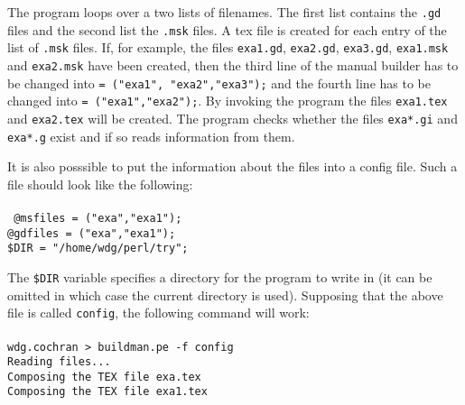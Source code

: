 \documentclass[a4wide]{article}
\begin{document}
The program loops over a two lists of filenames. The first list contains
the {\tt .gd} files and the second list the {\tt .msk} files. 
A tex file is created for each entry of the list of {\tt .msk} files.
If, for example, the files {\tt exa1.gd}, {\tt exa2.gd}, {\tt exa3.gd}, 
{\tt exa1.msk} and {\tt exa2.msk} have been created, then the third
line of the manual builder has to be changed into {\tt \@@gdfiles = ("exa1",
"exa2","exa3");} and the fourth line has to be changed into 
{\tt \@@msfiles = ("exa1","exa2");}.
By invoking the program the files {\tt exa1.tex} and {\tt exa2.tex} will be 
created. The program
checks whether the files {\tt exa*.gi} and {\tt exa*.g} exist and if so reads
information from them.\par
It is also posssible to put the information about the files into a config
file. Such a file should look like the following:\\
\vspace{2mm}\\
{\tt 
\noindent @msfiles = ("exa","exa1");\\
@gdfiles = ("exa","exa1");\\
\$DIR = "/home/wdg/perl/try";\\
}

The {\tt \$DIR} variable specifies a directory for the program to write in
(it can be omitted in which case the current directory is used). Supposing
that the above file is called {\tt config}, the following command will
work:\\
\vspace{2mm}\\
{\tt \noindent wdg.cochran > buildman.pe -f config\\
Reading files...\\
Composing the TEX file exa.tex\\
Composing the TEX file exa1.tex\\
}
\end{document}

